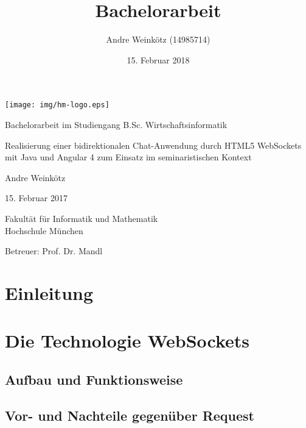 \documentclass[11pt,a4paper,titlepage]{scrartcl}
\title{Bachelorarbeit}
\author{Andre Weinkötz (14985714)}
\date{15. Februar 2018}
\numberwithin{equation}{section}
\begin{document}
  \pagestyle{empty}

  \begin{titlepage}

\begin{center}
	\texttt{[image: img/hm-logo.eps]}
\end{center}
 \bigskip

 \begin{center} \large 
    
    Bachelorarbeit im Studiengang B.Sc. Wirtschaftsinformatik
    \vspace*{2.5cm}
\end{center}
    {\huge Realisierung einer bidirektionalen Chat-Anwendung durch HTML5 WebSockets mit Java und Angular 4 zum Einsatz im seminaristischen Kontext}
    
    \vspace*{2.0cm}
 \begin{center}
    Andre Weinkötz \bigskip
    
    

    15. Februar 2017
    \vspace*{2.5cm}
    
    

    Fakultät für Informatik und Mathematik \\
	Hochschule München\bigskip
	
	Betreuer: Prof. Dr. Mandl 
	
	
  \end{center}
\end{titlepage}


 \tableofcontents

\newpage
  \pagestyle{headings}

\section{Einleitung}

\section{Die Technologie WebSockets}
\subsection{Aufbau und Funktionsweise}
\subsection{Vor- und Nachteile gegenüber Request}
\end{document}
